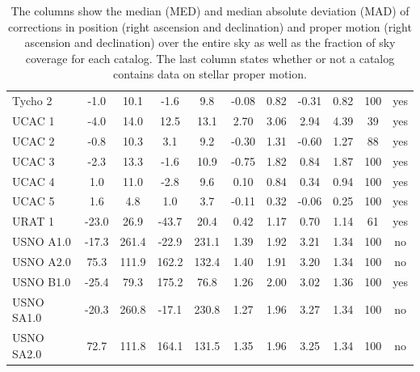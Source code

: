 \documentclass[review]{elsarticle}
\begin{document}
\begin{table}
\begin{center}
\begin{tabular}{|l|cc|cc|cc|cc|c|c|}
Tycho 2& -1.0& 10.1& -1.6& 9.8& -0.08& 0.82& -0.31& 0.82& 100& yes\\ 
UCAC 1& -4.0& 14.0& 12.5& 13.1& 2.70& 3.06& 2.94& 4.39& 39& yes\\ 
UCAC 2& -0.8& 10.3& 3.1& 9.2& -0.30& 1.31& -0.60& 1.27& 88& yes\\ 
UCAC 3& -2.3& 13.3& -1.6& 10.9& -0.75& 1.82& 0.84& 1.87& 100& yes\\ 
UCAC 4& 1.0& 11.0& -2.8& 9.6& 0.10& 0.84& 0.34& 0.94& 100& yes\\ 
UCAC 5& 1.6& 4.8& 1.0& 3.7& -0.11& 0.32& -0.06& 0.25& 100& yes\\ 
URAT 1& -23.0& 26.9& -43.7& 20.4& 0.42& 1.17& 0.70& 1.14& 61& yes\\ 
USNO A1.0&-17.3& 261.4& -22.9& 231.1& 1.39& 1.92& 3.21& 1.34& 100& no\\ 
USNO A2.0& 75.3& 111.9& 162.2& 132.4& 1.40& 1.91& 3.20& 1.34& 100& no\\ 
USNO B1.0& -25.4& 79.3& 175.2& 76.8& 1.26& 2.00& 3.02& 1.36& 100& yes\\ 
USNO SA1.0& -20.3& 260.8& -17.1& 230.8& 1.27& 1.96& 3.27& 1.34&100& no\\
USNO SA2.0& 72.7& 111.8& 164.1& 131.5& 1.35& 1.96& 3.25& 1.34& 100& no\\ 
\hline
\end{tabular}
\end{center}
\caption{The columns show the median (MED) and median absolute deviation (MAD) of corrections in
  position (right ascension and declination) and proper motion (right ascension and declination) over the entire sky as well as the fraction of sky coverage for each catalog. The last column states whether or not a catalog contains data on stellar proper motion.}
\label{tab:cat_stats}
\end{table}
\end{document}
